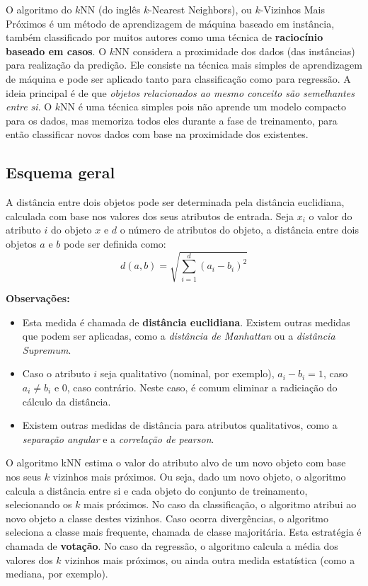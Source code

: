 O algoritmo do $k$NN (do inglês $k$-Nearest Neighbors), ou $k$-Vizinhos Mais Próximos é um método de aprendizagem de máquina baseado em instância, também classificado por muitos autores como uma técnica de \textbf{raciocínio baseado em casos}. O $k$NN considera a proximidade dos dados (das instâncias) para realização da predição. Ele consiste na técnica mais simples de aprendizagem de máquina e pode ser aplicado tanto para classificação como para regressão. A ideia principal é de que \textit{objetos relacionados ao mesmo conceito são semelhantes entre si}. O $k$NN é uma técnica simples pois não aprende um modelo compacto para os dados, mas memoriza todos eles durante a fase de treinamento, para então classificar novos dados com base na proximidade dos existentes.

\subsection{Esquema geral}

A distância entre dois objetos pode ser determinada pela distância euclidiana, calculada com base nos valores dos seus atributos de entrada. Seja $x_i$ o valor do atributo $i$ do objeto $x$ e $d$ o número de atributos do objeto, a distância entre dois objetos $a$ e $b$ pode ser definida como:
$$
d(a, b) = \sqrt{\sum_{i=1}^{d} (a_i - b_i)^2}
$$

\textbf{Observações:}
\begin{itemize}
	\item Esta medida é chamada de \textbf{distância euclidiana}. Existem outras medidas que podem ser aplicadas, como a \textit{distância de Manhattan} ou a \textit{distância Supremum}.
	\item Caso o atributo $i$ seja qualitativo (nominal, por exemplo), $a_i - b_i = 1$, caso $a_i \neq b_i$ e 0, caso contrário. Neste caso, é comum eliminar a radiciação do cálculo da distância.
	\item Existem outras medidas de distância para atributos qualitativos, como a \textit{separação angular} e a \textit{correlação de pearson}.
\end{itemize}

\insertspace

O algoritmo kNN estima o valor do atributo alvo de um novo objeto com base nos seus $k$ vizinhos mais próximos. Ou seja, dado um novo objeto, o algoritmo calcula a distância entre si e cada objeto do conjunto de treinamento, selecionando os $k$ mais próximos. No caso da classificação, o algoritmo atribui ao novo objeto a classe destes vizinhos. Caso ocorra divergências, o algoritmo seleciona a classe mais frequente, chamada de classe majoritária. Esta estratégia é chamada de \textbf{votação}. No caso da regressão, o algoritmo calcula a média dos valores dos $k$ vizinhos mais próximos, ou ainda outra medida estatística (como a mediana, por exemplo).

